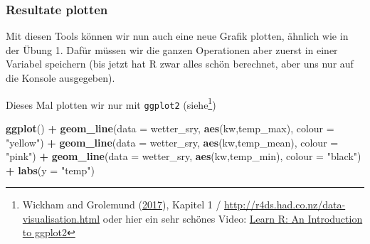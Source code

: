 \documentclass[]{book}
\newenvironment{Shaded}{\begin{snugshade}}{\end{snugshade}}
\newcommand{\DataTypeTok}[1]{\textcolor[rgb]{0.13,0.29,0.53}{#1}}
\newcommand{\KeywordTok}[1]{\textcolor[rgb]{0.13,0.29,0.53}{\textbf{#1}}}
\newcommand{\NormalTok}[1]{#1}
\newcommand{\OperatorTok}[1]{\textcolor[rgb]{0.81,0.36,0.00}{\textbf{#1}}}
\newcommand{\StringTok}[1]{\textcolor[rgb]{0.31,0.60,0.02}{#1}}
\let\rmarkdownfootnote\footnote%
\def\footnote{\protect\rmarkdownfootnote}
\begin{document}
\hypertarget{resultate-plotten}{%
\subsubsection{Resultate plotten}\label{resultate-plotten}}

Mit diesen Tools können wir nun auch eine neue Grafik plotten, ähnlich wie in der Übung 1. Dafür müssen wir die ganzen Operationen aber zuerst in einer Variabel speichern (bis jetzt hat R zwar alles schön berechnet, aber uns nur auf die Konsole ausgegeben).

\begin{Shaded}
\end{Shaded}

Dieses Mal plotten wir nur mit \texttt{ggplot2} (siehe\footnote{Wickham and Grolemund (\protect\hyperlink{ref-wickham2017}{2017}), Kapitel 1 / \url{http://r4ds.had.co.nz/data-visualisation.html} oder hier ein sehr schönes Video: \href{https://youtu.be/YxKr2a-Y1WE?t=1m40s}{Learn R: An Introduction to ggplot2}})

\begin{Shaded}
\begin{Highlighting}[]

\KeywordTok{ggplot}\NormalTok{() }\OperatorTok{+}
\StringTok{  }\KeywordTok{geom_line}\NormalTok{(}\DataTypeTok{data =}\NormalTok{ wetter_sry, }\KeywordTok{aes}\NormalTok{(kw,temp_max), }\DataTypeTok{colour =} \StringTok{"yellow"}\NormalTok{) }\OperatorTok{+}
\StringTok{  }\KeywordTok{geom_line}\NormalTok{(}\DataTypeTok{data =}\NormalTok{ wetter_sry, }\KeywordTok{aes}\NormalTok{(kw,temp_mean), }\DataTypeTok{colour =} \StringTok{"pink"}\NormalTok{) }\OperatorTok{+}
\StringTok{  }\KeywordTok{geom_line}\NormalTok{(}\DataTypeTok{data =}\NormalTok{ wetter_sry, }\KeywordTok{aes}\NormalTok{(kw,temp_min), }\DataTypeTok{colour =} \StringTok{"black"}\NormalTok{) }\OperatorTok{+}
\StringTok{  }\KeywordTok{labs}\NormalTok{(}\DataTypeTok{y =} \StringTok{"temp"}\NormalTok{)}
\end{Highlighting}
\end{Shaded}
\end{document}
